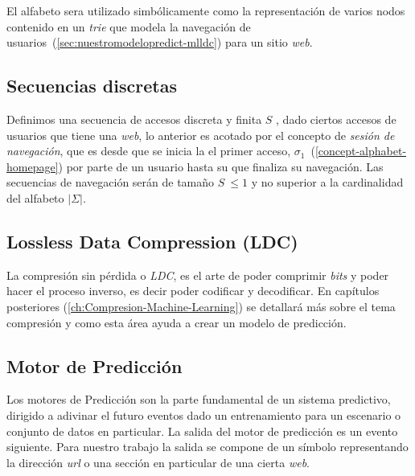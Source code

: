 El alfabeto sera utilizado simbólicamente como la representación de varios nodos contenido en un \emph{trie} que {modela la navegación de usuarios}~(\ref{sec:nuestromodelopredict-mlldc}) para un sitio \emph{web}.





\subsection{Secuencias discretas}\label{concept-discret-seq}

Definimos una secuencia de accesos discreta y finita  $S$ , dado ciertos accesos de usuarios que tiene una \emph{web}, lo anterior es acotado por el concepto de \emph{sesión de navegación}, que es desde que se inicia la el primer acceso, $\sigma_{1}$~(\ref{concept-alphabet-homepage}) por parte de un usuario hasta su que finaliza su navegación. Las secuencias de navegación serán de tamaño $S\ \leq 1$ y  no superior a la cardinalidad del alfabeto $|\Sigma|$.



\subsection{Lossless Data Compression (LDC)} \label{concept-LDC}

La compresión sin pérdida o \emph{LDC}, es el arte de poder comprimir \emph{bits} y poder hacer el proceso inverso, es decir poder codificar y decodificar. En capítulos posteriores (\ref{ch:Compresion-Machine-Learning}) se detallará más sobre el tema compresión y como esta área ayuda a crear un modelo de predicción.



\subsection{Motor de Predicción}\label{concept-enginepredict}

Los motores de Predicción son la parte fundamental de un sistema predictivo, dirigido a adivinar el futuro eventos dado un entrenamiento para un escenario o conjunto de datos en particular. La salida del motor de predicción es un evento siguiente. Para nuestro trabajo la salida se compone de un símbolo representando la dirección \emph{url} o una sección en particular de una cierta \emph{web}. 

